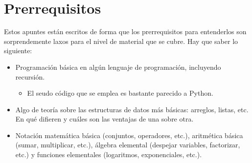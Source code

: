 \part*{Prerrequisitos}

Estos apuntes están escritos de forma que los prerrequisitos para entenderlos son sorprendemente laxos para el nivel de material que se cubre. Hay que saber lo siguiente:
\begin{itemize}
  \item Programación básica en algún lenguaje de programación, incluyendo recursión. 
  \begin{itemize}
    \item El seudo código que se emplea es bastante parecido a Python.
  \end{itemize}
  \item Algo de teoría sobre las estructuras de datos más básicas: arreglos, listas, etc. En qué difieren y cuáles son las ventajas de una sobre otra.
  \item Notación matemática básica (conjuntos, operadores, etc.), aritmética básica (sumar, multiplicar, etc.), álgebra elemental (despejar variables, factorizar, etc.) y funciones elementales (logaritmos, exponenciales, etc.).
\end{itemize}
